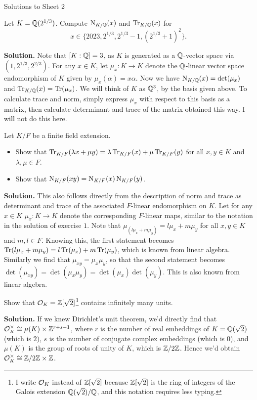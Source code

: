 \documentclass[a4paper,11pt]{article}
\begin{document}
\begin{center}
    \huge{Solutions to Sheet 2}
\end{center}

Let $K = \mathbb{Q}(2^{1/3})$. Compute $\operatorname{N}_{K/\mathbb{Q}}(x)$ and $\operatorname{Tr}_{K/\mathbb{Q}}(x)$ for 
$$ x \in \{2023, 2^{1/3}, 2^{1/3}-1, (2^{1/3}+1)^2\}.$$

\textbf{Solution.} Note that $[K:\mathbb{Q}] = 3$, as $K$ is generated as a $\mathbb{Q}$-vector
space via $(1,2^{1/3}, 2^{2/3})$. For any $x \in K$, let $\mu_x: K \to K$ denote
the $\mathbb{Q}$-linear vector space endomorphism of $K$ given by $\mu_x(\alpha) = x
\alpha$. Now we have 
$\operatorname{N}_{K/\mathbb{Q}}(x) = \det(\mu_x)$ and $\operatorname{Tr}_{K/\mathbb{Q}}(x) = \operatorname{Tr}(\mu_x)$. We will think
of $K$
as $\mathbb{Q}^3$, by the basis given above. To calculate trace and norm, simply
express $\mu_x$ with respect to this basis as a matrix, then calculate
determinant and trace of the matrix obtained this way. I will not do this here.

Let $K/F$ be a finite field extension. 

\begin{itemize}
    \item Show that $\operatorname{Tr}_{K/F}(\lambda x + \mu y) = \lambda \operatorname{Tr}_{K/F}(x) + \mu
        \operatorname{Tr}_{K/F}(y)$ for all $x,y \in K$ and $\lambda, \mu \in F$.
    \item Show that $\operatorname{N}_{K/F}(xy) = \operatorname{N}_{K/F}(x) \operatorname{N}_{K/F}(y)$.
\end{itemize}

\textbf{Solution.}
This also follows directly from the description of norm and trace as determinant
and trace of the associated $F$-linear endomorphism on $K$. Let for any $x \in K$
$\mu_x: K \to K$ denote the corresponding $F$-linear maps, similar to
the notation in the solution of exercise $1$. Note that
$\mu_{(l \mu_x + m \mu_y)} = l \mu_x + m \mu_y$ for all $x,y \in K$ and $m,l
\in F$. Knowing this, the first
statement becomes $\operatorname{Tr}(l \mu_x + m \mu_y) = l \operatorname{Tr}(\mu_x) + m \operatorname{Tr}(\mu_y)$, which
is known from linear algebra. Similarly we find that 
$\mu_{xy} = \mu_x \mu_y$, so that the second statement becomes 
$\det(\mu_{xy} )=  \det(\mu_x \mu_y) = \det(\mu_x) \det(\mu_y)$. This is also
known from linear algebra.

Show that $\mathcal{O}_K = \mathbb{Z}[\sqrt 2]$\footnote{I write $\mathcal{O}_K$ instead of $\mathbb{Z}[\sqrt
    2]$ because $\mathbb{Z}[\sqrt 2]$ is the ring of integers of the Galois extension
    $\mathbb{Q}(\sqrt 2)/\mathbb{Q}$, and this notation requires less typing.} 
    contains infinitely many units. 

\textbf{Solution.}
If we knew Dirichlet's unit theorem, we'd directly find that $\mathcal{O}_K^\times
\cong \mu(K) \times \mathbb{Z}^{r+s-1}$,
where $r$ is the number of real embeddings of $K = \mathbb{Q}(\sqrt 2)$ (which is $2$),
$s$ is the number of conjugate complex embeddings (which is $0$), and $\mu(K)$
is the group of roots of unity of $K$, which is $\mathbb{Z}/2\mathbb{Z}$. Hence we'd obtain
$\mathcal{O}_K^\times \cong \mathbb{Z}/2\mathbb{Z} \times \mathbb{Z}$. 
\end{document}
